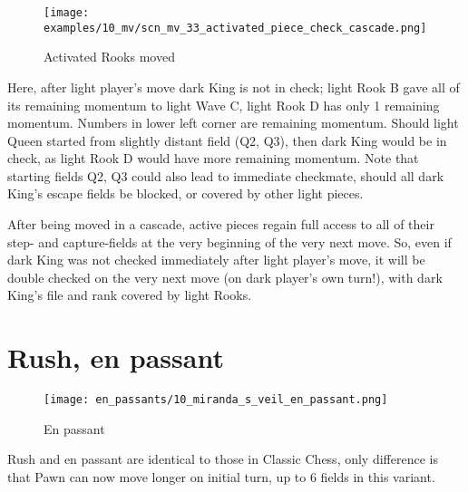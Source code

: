 \vspace*{-2.1\baselineskip}
\noindent
\begin{figure}[!h]
\texttt{[image: examples/10\_mv/scn\_mv\_33\_activated\_piece\_check\_cascade.png]}
\caption{Activated Rooks moved}
\label{fig:scn_mv_33_activated_piece_check_cascade}
\end{figure}

Here, after light player's move dark King is not in check; light Rook B gave all of its
remaining momentum to light Wave C, light Rook D has only 1 remaining momentum. Numbers
in lower left corner are remaining momentum. Should light Queen started from slightly
distant field (Q2, Q3), then dark King would be in check, as light Rook D would have
more remaining momentum. Note that starting fields Q2, Q3 could also lead to immediate
checkmate, should all dark King's escape fields be blocked, or covered by other light
pieces.

After being moved in a cascade, active pieces regain full access to all of their step- and
capture-fields at the very beginning of the very next move. So, even if dark King was not
checked immediately after light player's move, it will be double checked on the very next
move (on dark player's own turn!), with dark King's file and rank covered by light Rooks.

\clearpage %

\section*{Rush, en passant}

\noindent
\begin{wrapfigure}[5]{l}{0.4\textwidth}
\centering
\texttt{[image: en\_passants/10\_miranda\_s\_veil\_en\_passant.png]}
\caption{En passant}
\label{fig:10_miranda_s_veil_en_passant}
\end{wrapfigure}
Rush and en passant are identical to those in Classic Chess, only difference
is that Pawn can now move longer on initial turn, up to 6 fields in this
variant.



